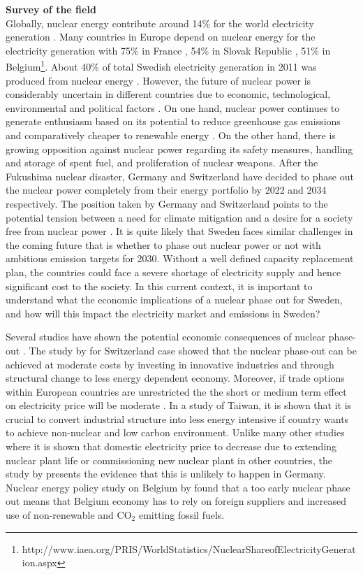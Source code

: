 \textbf{Survey of the field}\\
Globally, nuclear energy contribute around 14\% for the world electricity generation \citep{OECD2012}. Many countries in Europe depend on nuclear energy for the electricity generation with 75\% in France , 54\% in Slovak Republic , 51\% in Belgium\footnote{http://www.iaea.org/PRIS/WorldStatistics/NuclearShareofElectricityGeneration.aspx}. About 40\% of total Swedish electricity generation in 2011 was produced from nuclear energy \citep{SEA2012}. However, the future of nuclear power is considerably uncertain in different countries due to economic, technological, environmental and political factors \citep{Joskow2012}. On one hand, nuclear power continues to generate enthusiasm based on its potential to reduce greenhouse gas emissions and comparatively cheaper to renewable energy \citep{Davis2012, Renssen2013}. On the other hand, there is growing opposition against nuclear power regarding its safety measures, handling and storage of spent fuel, and proliferation of nuclear weapons. After the Fukushima nuclear disaster, Germany and Switzerland have decided to phase out the nuclear power completely from their energy portfolio by  2022 and 2034 respectively. The position taken by Germany and Switzerland points to the potential tension between a need for climate mitigation and a desire for a society free from nuclear power \citep{Glomsrod2013}. It is quite likely that Sweden faces similar challenges in the coming future that is whether to phase out nuclear power or not with ambitious emission targets for 2030. Without a well defined capacity replacement plan, the countries could face a severe shortage of electricity supply and hence significant cost to the society. In this current context, it is important to understand what the economic implications of a nuclear phase out for Sweden, and how will this impact the electricity market and emissions in Sweden?

Several studies have shown the potential economic consequences of nuclear phase-out \citep{Bohringer2002, Nestle2012, Bretschger2012, Duscha0, Glomsrod2013, Kunsch2014}. The study by \cite{Bretschger2012} for Switzerland case showed that the nuclear phase-out can be achieved at moderate costs by investing in innovative industries and through structural change to less energy dependent economy. Moreover, if trade options within European countries are unrestricted the the short or medium term effect on electricity price will be moderate \citep{Glomsrod2013}. In a study \citep{Chen2013} of Taiwan, it is shown that it is crucial to convert industrial structure into less energy intensive if country wants to achieve non-nuclear and low carbon environment. Unlike many other studies where it is shown that domestic electricity price to decrease due to extending nuclear plant life or commissioning new nuclear plant in other countries, the study by \citep{Nestle2012} presents the evidence that this is unlikely to happen in Germany. Nuclear energy policy study on Belgium by \cite{Kunsch2014} found that a too early nuclear phase out means that Belgium economy has to rely on foreign suppliers and increased use of non-renewable and CO$_2$ emitting fossil fuels.

